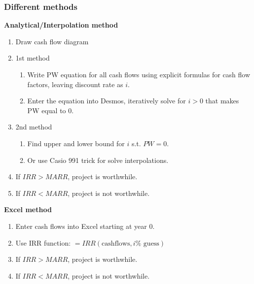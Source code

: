 \subsubsection{Different methods}
\begin{process}

    \textbf{Analytical/Interpolation method}
        \begin{enumerate}
            \item Draw cash flow diagram
            \item 1st method
            \begin{enumerate}
                \item Write PW equation for all cash flows using explicit formulas for cash flow factors, leaving discount rate as $i$.
                \item Enter the equation into Desmos, iteratively solve for $i > 0$ that makes PW equal to 0.
            \end{enumerate}
            \item 2nd method
            \begin{enumerate}
                \item Find upper and lower bound for $i$ s.t. $PW=0$. 
                \item Or use Casio 991 trick for solve interpolations. 
            \end{enumerate}
            \item If $IRR > MARR$, project is worthwhile.
            \item If $IRR < MARR$, project is not worthwhile.
        \end{enumerate}

    \vspace{1em}
    \textbf{Excel method}
        \begin{enumerate}
            \item Enter cash flows into Excel starting at year 0.
            \item Use IRR function: $=IRR(\text{cashflows}, i\% \text{ guess})$
            \item If $IRR > MARR$, project is worthwhile.
            \item If $IRR < MARR$, project is not worthwhile.
        \end{enumerate}            
\end{process}

